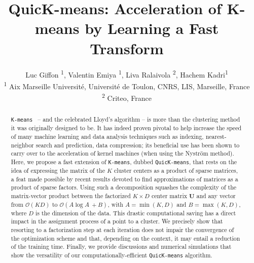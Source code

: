 \documentclass[letterpaper]{article} %
\title{QuicK-means: Acceleration of K-means by Learning a Fast Transform}
\author{%
  Luc Giffon  \textsuperscript{\rm 1},
Valentin Emiya \textsuperscript{\rm 1},
Liva Ralaivola \textsuperscript{\rm 2},
Hachem Kadri\textsuperscript{\rm 1} \\
\textsuperscript{\rm 1} Aix Marseille Université, Université de Toulon, CNRS, LIS, Marseille, France \\
\textsuperscript{\rm 2} Criteo, France
}
\def\datadim{D}
\def\nclusters{K}
\def\kmeans{\texttt{K-means}\xspace}
\begin{document}
\maketitle
{}
\begin{abstract}
\kmeans~ -- and the celebrated Lloyd's algorithm -- is more than the clustering method it was originally designed to be. 
It has indeed proven pivotal to help increase the speed of many machine learning and data analysis techniques such as indexing, nearest-neighbor search and prediction, data compression; its beneficial use has been shown to carry over to the acceleration of kernel machines (when using the Nyström method). 
Here, we propose a fast extension of \kmeans, dubbed \texttt{QuicK-means}, that rests on the idea of expressing the matrix of the $\nclusters$ cluster centers as a product of sparse matrices, a feat made possible by recent results devoted to find approximations of matrices as a product of sparse factors.
Using such a decomposition squashes the complexity of the matrix-vector product between the factorized $\nclusters \times \datadim$ center matrix $\mathbf{U}$ and any vector from $\mathcal{O}(\nclusters \datadim)$ to $\mathcal{O}(A \log A~ +B)$, with $A=\min (\nclusters,\datadim)$ and $B=\max (\nclusters,\datadim)$, where $\datadim$ is the dimension of the data. 
This drastic computational saving has a direct impact in the assignment process of a point to a cluster.
We precisely show that resorting to a factorization step at each iteration does not impair the convergence of the optimization scheme and that, depending on the context, it may entail a reduction of the training time. Finally, we provide discussions and numerical simulations that show the versatility of our computationally-efficient  \texttt{QuicK-means} algorithm. 
\end{abstract}









\cleardoublepage
\onecolumn 
\appendix
\renewcommand\appendixpagename{Supplemental material}
\appendixpage

\end{document}
